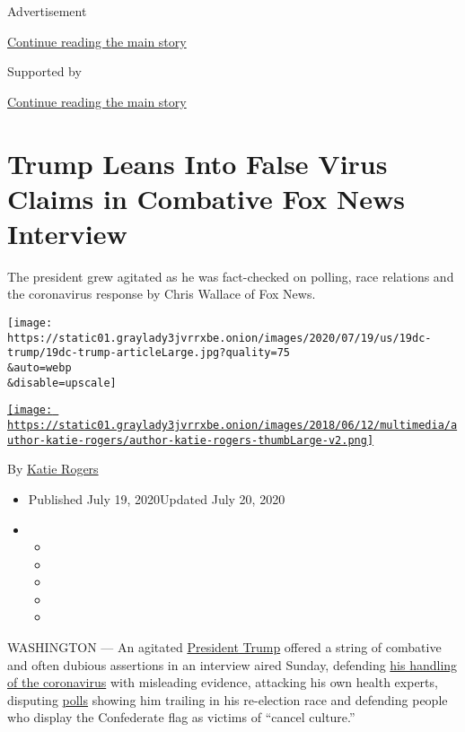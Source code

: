 Advertisement

\protect\hyperlink{after-top}{Continue reading the main story}

Supported by

\protect\hyperlink{after-sponsor}{Continue reading the main story}

\hypertarget{trump-leans-into-false-virus-claims-in-combative-fox-news-interview}{%
\section{Trump Leans Into False Virus Claims in Combative Fox News
Interview}\label{trump-leans-into-false-virus-claims-in-combative-fox-news-interview}}

The president grew agitated as he was fact-checked on polling, race
relations and the coronavirus response by Chris Wallace of Fox News.

\texttt{[image: https://static01.graylady3jvrrxbe.onion/images/2020/07/19/us/19dc-trump/19dc-trump-articleLarge.jpg?quality=75\\\&auto=webp\\\&disable=upscale]}

\href{https://www.nytimes3xbfgragh.onion/by/katie-rogers}{\texttt{[image: https://static01.graylady3jvrrxbe.onion/images/2018/06/12/multimedia/author-katie-rogers/author-katie-rogers-thumbLarge-v2.png]}}

By \href{https://www.nytimes3xbfgragh.onion/by/katie-rogers}{Katie
Rogers}

\begin{itemize}
\item
  Published July 19, 2020Updated July 20, 2020
\item
  \begin{itemize}
  \item
  \item
  \item
  \item
  \item
  \end{itemize}
\end{itemize}

WASHINGTON --- An agitated
\href{https://www.nytimes3xbfgragh.onion/interactive/2020/us/elections/donald-trump.html}{President
Trump} offered a string of combative and often dubious assertions in an
interview aired Sunday, defending
\href{https://www.nytimes3xbfgragh.onion/2020/07/18/us/politics/trump-coronavirus-response-failure-leadership.html}{his
handling of the coronavirus} with misleading evidence, attacking his own
health experts, disputing
\href{https://www.nytimes3xbfgragh.onion/2020/07/20/us/politics/trump-polls-senate.html}{polls}
showing him trailing in his re-election race and defending people who
display the Confederate flag as victims of ``cancel culture.''

